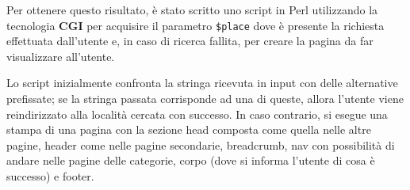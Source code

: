 Per ottenere questo risultato, è stato scritto uno script in Perl utilizzando
la tecnologia \textbf{CGI} per acquisire il parametro \texttt{\$place} dove è
presente la richiesta effettuata dall'utente e, in caso di ricerca fallita,
per creare la pagina da far visualizzare all'utente.

Lo script inizialmente confronta la stringa ricevuta in input con delle
alternative prefissate; se la stringa passata corrisponde ad una di queste,
allora l'utente viene reindirizzato alla località cercata con successo.
In caso contrario, si esegue una stampa di una pagina con la sezione
head composta come quella nelle altre pagine, header come nelle pagine
secondarie, breadcrumb, nav con possibilità di andare nelle pagine delle
categorie, corpo (dove si informa l'utente di cosa è successo) e footer.
